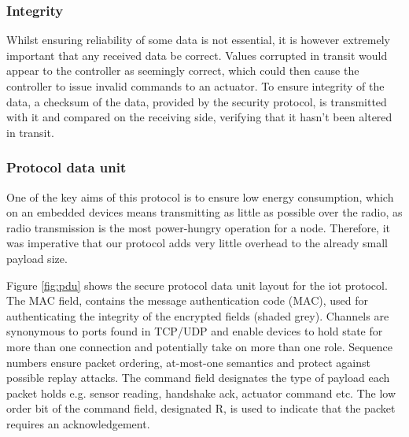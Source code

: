 \documentclass[conference]{./sty/IEEEtran}
\begin{document}
\subsubsection*{Integrity} %
\label{ssub:integrity}
Whilst ensuring reliability of some data is not essential, it is however extremely important that any received data be correct. Values corrupted in transit would appear to the controller as seemingly correct, which could then cause the controller to issue invalid commands to an actuator. To ensure integrity of the data, a checksum of the data, provided by the security protocol, is transmitted with it and compared on the receiving side, verifying that it hasn't been altered in transit.  

\subsubsection*{Protocol data unit} %
\label{ssub:protocol_data_unit}
One of the key aims of this protocol is to ensure low energy consumption, which on an embedded devices means transmitting as little as possible over the radio, as radio transmission is the most power-hungry operation for a node. Therefore, it was imperative that our protocol adds very little overhead to the already small payload size.

Figure \ref{fig:pdu} shows the secure protocol data unit layout for the iot protocol. The MAC field, contains the message authentication code (MAC), used for authenticating the integrity of the encrypted fields (shaded grey). Channels are synonymous to ports found in TCP/UDP and enable devices to hold state for more than one connection and potentially take on more than one role. Sequence numbers ensure packet ordering, at-most-one semantics and protect against possible replay attacks. The command field designates the type of payload each packet holds e.g. sensor reading, handshake ack, actuator command etc. The low order bit of the command field, designated R, is used to indicate that the packet requires an acknowledgement.

\newcommand{\colorbitbox}[4]{%
\rlap{\bitbox[#1]{#3}{\color{#2}\rule{\width}{\height}}}%
\bitbox[#1]{#3}{#4}}
\end{document}
